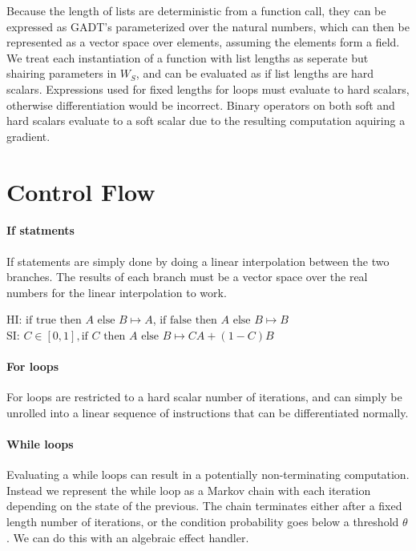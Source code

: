 \documentclass{article}
\begin{document}
Because the length of lists are deterministic from a function call, they can be expressed as GADT's parameterized over the natural numbers, which can then be represented as a vector space over elements, assuming the elements form a field. We treat each instantiation of a function with list lengths as seperate but shairing parameters in $W_S$, and can be evaluated as if list lengths are hard scalars. Expressions used for fixed lengths for loops must evaluate to hard scalars, otherwise differentiation would be incorrect. Binary operators on both soft and hard scalars evaluate to a soft scalar due to the resulting computation aquiring a gradient.
\section{Control Flow}
\paragraph{If statments} If statements are simply done by doing a linear interpolation between the two branches. The results of each branch must be a vector space over the real numbers for the linear interpolation to work.

\begin{center}
  HI: $\text{if } \text{true} \text{ then } A \text{ else } B \mapsto A$, $\text{if } \text{false} \text{ then } A \text{ else } B \mapsto B$\\
  SI: $C \in [0, 1], \text{if } C \text{ then } A \text{ else } B \mapsto CA + (1-C)B$
\end{center}

\paragraph{For loops} For loops are restricted to a hard scalar number of iterations, and can simply be unrolled into a linear sequence of instructions that can be differentiated normally.

\paragraph{While loops} Evaluating a while loops can result in a potentially non-terminating computation. Instead we represent the while loop as a Markov chain with each iteration depending on the state of the previous. The chain terminates either after a fixed length number of iterations, or the condition probability goes below a threshold $\theta$. We can do this with an algebraic effect handler.
\end{document}
